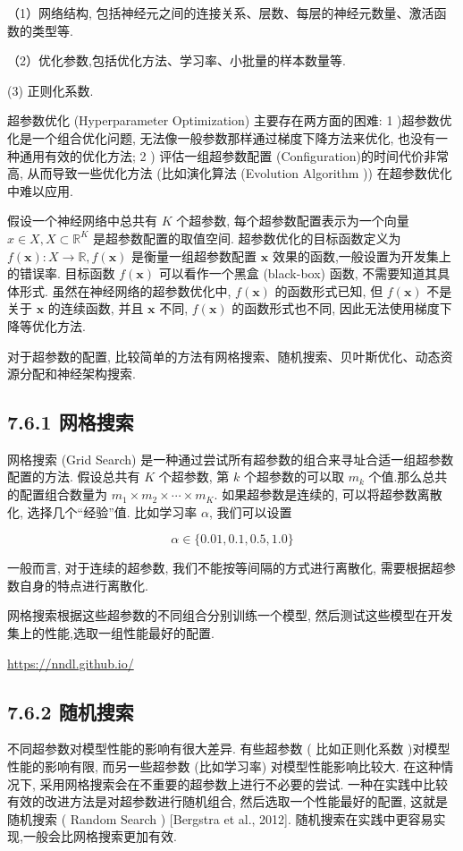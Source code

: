 \documentclass[10pt]{article}
\begin{document}
（1）网络结构, 包括神经元之间的连接关系、层数、每层的神经元数量、激活函数的类型等.

（2）优化参数,包括优化方法、学习率、小批量的样本数量等.

(3) 正则化系数.

超参数优化 (Hyperparameter Optimization) 主要存在两方面的困难: 1 )超参数优化是一个组合优化问题, 无法像一般参数那样通过梯度下降方法来优化, 也没有一种通用有效的优化方法; 2 ) 评估一组超参数配置 (Configuration)的时间代价非常高, 从而导致一些优化方法 (比如演化算法 (Evolution Algorithm )) 在超参数优化中难以应用.

假设一个神经网络中总共有 $K$ 个超参数, 每个超参数配置表示为一个向量 $x \in X, X \subset \mathbb{R}^{K}$ 是超参数配置的取值空间. 超参数优化的目标函数定义为 $f(\boldsymbol{x}): X \rightarrow \mathbb{R}, f(\boldsymbol{x})$ 是衡量一组超参数配置 $\boldsymbol{x}$ 效果的函数,一般设置为开发集上的错误率. 目标函数 $f(\boldsymbol{x})$ 可以看作一个黑盒 (black-box) 函数, 不需要知道其具体形式. 虽然在神经网络的超参数优化中, $f(\boldsymbol{x})$ 的函数形式已知, 但 $f(\boldsymbol{x})$ 不是关于 $\boldsymbol{x}$ 的连续函数, 并且 $\boldsymbol{x}$ 不同, $f(\boldsymbol{x})$ 的函数形式也不同, 因此无法使用梯度下降等优化方法.

对于超参数的配置, 比较简单的方法有网格搜索、随机搜索、贝叶斯优化、动态资源分配和神经架构搜索.

\subsection*{7.6.1 网格搜索}
网格搜索 (Grid Search) 是一种通过尝试所有超参数的组合来寻址合适一组超参数配置的方法. 假设总共有 $K$ 个超参数, 第 $k$ 个超参数的可以取 $m_{k}$ 个值.那么总共的配置组合数量为 $m_{1} \times m_{2} \times \cdots \times m_{K}$. 如果超参数是连续的, 可以将超参数离散化, 选择几个“经验”值. 比如学习率 $\alpha$, 我们可以设置

$$
\alpha \in\{0.01,0.1,0.5,1.0\}
$$

一般而言, 对于连续的超参数, 我们不能按等间隔的方式进行离散化, 需要根据超参数自身的特点进行离散化.

网格搜索根据这些超参数的不同组合分别训练一个模型, 然后测试这些模型在开发集上的性能,选取一组性能最好的配置.

\href{https://nndl.github.io/}{https://nndl.github.io/}

\subsection*{7.6.2 随机搜索}
不同超参数对模型性能的影响有很大差异. 有些超参数 ( 比如正则化系数 )对模型性能的影响有限, 而另一些超参数 (比如学习率) 对模型性能影响比较大. 在这种情况下, 采用网格搜索会在不重要的超参数上进行不必要的尝试. 一种在实践中比较有效的改进方法是对超参数进行随机组合, 然后选取一个性能最好的配置, 这就是随机搜索 ( Random Search ) [Bergstra et al., 2012]. 随机搜索在实践中更容易实现,一般会比网格搜索更加有效.
\end{document}
